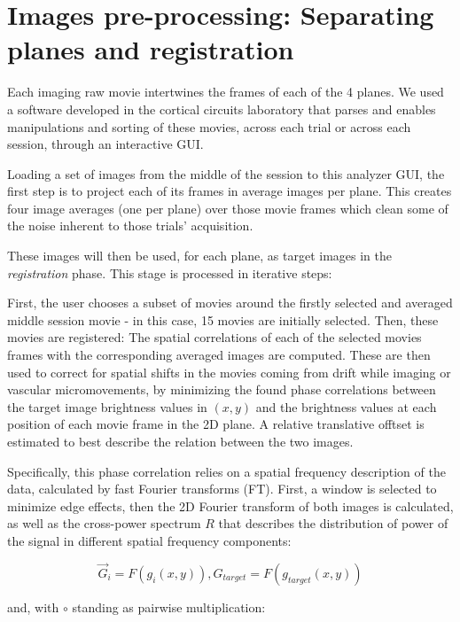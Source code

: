 \section{Images pre-processing: Separating planes and registration}
\label{sec:PreProcessing}

Each imaging raw movie intertwines the frames of each of the 4 planes. We used a software developed in the cortical circuits laboratory that parses and enables manipulations and sorting of these movies, across each trial or across each session, through an interactive GUI.

Loading a set of images from the middle of the session to this analyzer GUI, the first step is to project each of its frames in average images per plane. This creates four image averages (one per plane) over those movie frames which clean some of the noise inherent to those trials' acquisition.

These images will then be used, for each plane, as target images in the \textit{registration} phase. This stage is processed in iterative steps:

First, the user chooses a subset of movies around the firstly selected and averaged middle session movie - in this case, 15 movies are initially selected. Then, these movies are registered: The spatial correlations of each of the selected movies frames with the corresponding averaged images are computed. These are then used to correct for spatial shifts in the movies coming from drift while imaging or vascular micromovements, by minimizing the found phase correlations between the target image brightness values in $(x,y)$ and the brightness values at each position of each movie frame in the 2D plane. A relative translative offtset is estimated to best describe the relation between the two images.

Specifically, this phase correlation relies on a spatial frequency description of the data, calculated by fast Fourier transforms (FT). First, a window is selected to minimize edge effects, then the 2D Fourier transform of both images is calculated, as well as the cross-power spectrum $R$ that describes the distribution of power of the signal in different spatial frequency components:

\begin{equation}
\vec{G}_i = F (g_i(x,y)), G_{target}=F(g_{target}(x,y)) 
\end{equation}

and, with $\circ$ standing as pairwise multiplication:

